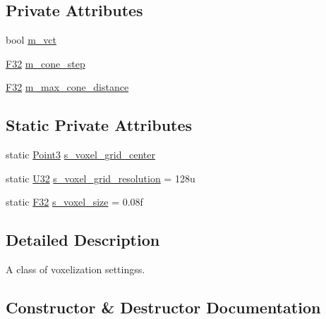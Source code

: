 \subsection*{Private Attributes}
\begin{DoxyCompactItemize}
\item 
bool \mbox{\hyperlink{classmage_1_1rendering_1_1_voxelization_settings_ac2edf702f2441db192bef28ec616b873}{m\+\_\+vct}}
\item 
\mbox{\hyperlink{namespacemage_aa97e833b45f06d60a0a9c4fc22ae02c0}{F32}} \mbox{\hyperlink{classmage_1_1rendering_1_1_voxelization_settings_a929769d77a323333146ae937bd5e5307}{m\+\_\+cone\+\_\+step}}
\item 
\mbox{\hyperlink{namespacemage_aa97e833b45f06d60a0a9c4fc22ae02c0}{F32}} \mbox{\hyperlink{classmage_1_1rendering_1_1_voxelization_settings_adb6172810eba8f59553bcbb9e2a7cbe3}{m\+\_\+max\+\_\+cone\+\_\+distance}}
\end{DoxyCompactItemize}
\subsection*{Static Private Attributes}
\begin{DoxyCompactItemize}
\item 
static \mbox{\hyperlink{structmage_1_1_point3}{Point3}} \mbox{\hyperlink{classmage_1_1rendering_1_1_voxelization_settings_a37151063ebbf6ae6ea193fb0ce05d270}{s\+\_\+voxel\+\_\+grid\+\_\+center}}
\item 
static \mbox{\hyperlink{namespacemage_a41c104c036fba3756a74e19f793eeaa1}{U32}} \mbox{\hyperlink{classmage_1_1rendering_1_1_voxelization_settings_aa709675f6700320077718e1954854ca6}{s\+\_\+voxel\+\_\+grid\+\_\+resolution}} = 128u
\item 
static \mbox{\hyperlink{namespacemage_aa97e833b45f06d60a0a9c4fc22ae02c0}{F32}} \mbox{\hyperlink{classmage_1_1rendering_1_1_voxelization_settings_a647150f56ef8546b6e18f5ad8dd2e661}{s\+\_\+voxel\+\_\+size}} = 0.\+08f
\end{DoxyCompactItemize}


\subsection{Detailed Description}
A class of voxelization settingss. 

\subsection{Constructor \& Destructor Documentation}
\mbox{\label{classmage_1_1rendering_1_1_voxelization_settings_a5c866be104571097091b07f113b2f680}} 
